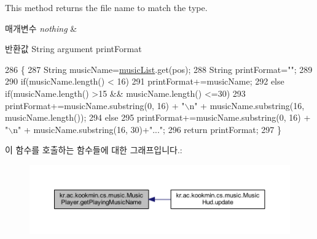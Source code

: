 This method returns the file name to match the type. 


\begin{DoxyParams}{매개변수}
{\em nothing} & \\
\hline
\end{DoxyParams}
\begin{DoxyReturn}{반환값}
String argument print\+Format 
\end{DoxyReturn}

\begin{DoxyCode}
286   \{
287     String musicName=\hyperlink{classkr_1_1ac_1_1kookmin_1_1cs_1_1music_1_1_music_player_a43bc24d44f1079340c3c9983c7df88a2}{musicList}.get(pos);
288     String printFormat=\textcolor{stringliteral}{""};
289 
290     \textcolor{keywordflow}{if}(musicName.length() < 16)
291       printFormat+=musicName;
292     \textcolor{keywordflow}{else} \textcolor{keywordflow}{if}(musicName.length() >15 && musicName.length() <=30)
293       printFormat+=musicName.substring(0, 16) + \textcolor{stringliteral}{"\(\backslash\)n"} + musicName.substring(16, musicName.length());
294     \textcolor{keywordflow}{else}
295       printFormat+=musicName.substring(0, 16) + \textcolor{stringliteral}{"\(\backslash\)n"} + musicName.substring(16, 30)+\textcolor{stringliteral}{"..."};
296     \textcolor{keywordflow}{return} printFormat;
297   \}
\end{DoxyCode}


이 함수를 호출하는 함수들에 대한 그래프입니다.\+:\nopagebreak
\begin{figure}[H]
\begin{center}
\leavevmode
\includegraphics[width=350pt]{classkr_1_1ac_1_1kookmin_1_1cs_1_1music_1_1_music_player_a2663e337f13310d1fb0f51fe66d69711_icgraph}
\end{center}
\end{figure}


\hypertarget{classkr_1_1ac_1_1kookmin_1_1cs_1_1music_1_1_music_player_ae4d53ac419495684317e05ae42885e8a}{}
